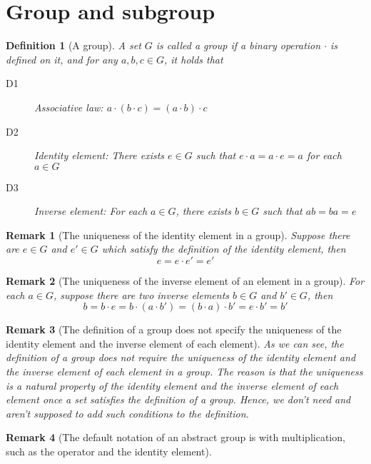 \documentclass[onecolumn]{ctexart}
\newtheorem{definition}{Definition}
\newtheorem{remark}{Remark}
\begin{document}
\section{Group and subgroup}

\begin{definition}[A group]
  A set $G$ is called a group if a binary operation $\cdot$ is defined on it, and for any $a, b, c \in G$, it holds that
  \begin{description}
    \item[D1] Associative law: $a \cdot (b \cdot c) = (a \cdot b) \cdot c$
    \item[D2] Identity element: There exists $e \in G$ such that $e \cdot a = a \cdot e = a$ for each $a \in G$
    \item[D3] Inverse element: For each $a \in G$, there exists $b \in G$ such that $ab = ba = e$
  \end{description}
\end{definition}
\begin{remark}[The uniqueness of the identity element in a group]
  Suppose there are $e \in G$ and $e' \in G$ which satisfy the definition of the identity element, then
  \[
    e = e \cdot e' = e'
  \]
\end{remark}
\begin{remark}[The uniqueness of the inverse element of an element in a group]
  For each $a \in G$, suppose there are two inverse elements $b \in G$ and $b' \in G$, then
  \[
    b = b \cdot e = b \cdot (a \cdot b') = (b \cdot a) \cdot b' = e \cdot b' = b'
  \]
\end{remark}
\begin{remark}[The definition of a group does not specify the uniqueness of the identity element and the inverse element of each element]
  As we can see, the definition of a group does not require the uniqueness of 
  the identity element and the inverse element of each element in a group. The 
  reason is that the uniqueness is a natural property of the identity element 
  and the inverse element of each element once a set satisfies the definition 
  of a group. Hence, we don't need and aren't supposed to add such conditions 
  to the definition.
\end{remark}
\begin{remark}[The default notation of an abstract group is with multiplication, such as the operator and the identity element]
  
\end{remark}
\end{document}
